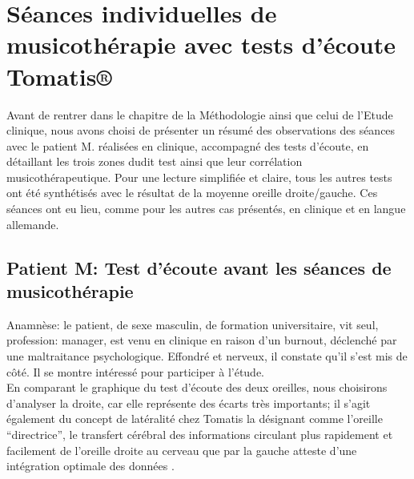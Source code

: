  
\section{ Séances individuelles  de musicothérapie avec tests d'écoute Tomatis®}

Avant de rentrer dans le chapitre de la Méthodologie ainsi que celui de l'Etude clinique, nous avons 
choisi de présenter un résumé des observations des 
séances avec le 
patient M. réalisées en clinique, accompagné des tests d'écoute, en détaillant 
les trois zones dudit test ainsi que  leur corrélation musicothérapeutique. 
Pour une lecture simplifiée et claire, tous les autres  tests ont été synthétisés avec le résultat de 
la moyenne oreille droite/gauche. %
Ces 
séances ont eu lieu, comme pour les autres cas 
présentés, en clinique et en langue allemande.

\subsection{Patient M: Test d'écoute avant les séances de musicothérapie}
Anamnèse: le patient, %
 de sexe masculin, de formation universitaire, vit seul, profession: 
manager,  est venu en clinique en raison d'un 
burnout, déclenché par 
une maltraitance psychologique. Effondré et nerveux, il constate qu'il s'est mis de côté. Il se montre
intéressé pour participer à l'étude. 
\\
En comparant le graphique du test d'écoute des deux oreilles, nous 
choisirons d'analyser la droite, car elle représente des écarts très 
importants; 
il s'agit également du concept de latéralité chez Tomatis la désignant comme l'oreille ``directrice'', le 
transfert cérébral des informations circulant plus rapidement et facilement  de l'oreille droite au cerveau  
que par la gauche atteste d'une intégration optimale des données \autocite {Tomatislangage}.


